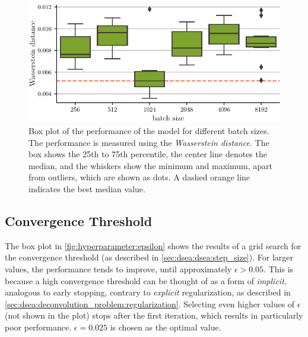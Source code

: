 \begin{figure}
  \centering
  \includegraphics[scale=1]{content/plots/hyperparam/batch_size_vs_wd_boxplot_lessheight.pdf}
  \caption{Box plot of the performance of the model for different batch sizes.
    The performance is measured using the \emph{Wasserstein distance}.
    The box shows the 25th to 75th percentile,
    the center line denotes the median,
    and the whiskers show the minimum and maximum,
      apart from outliers,
        which are shown as dots.
    A dashed orange line indicates the best median value.
  }
  \label{fig:hyperparameter:batch_size}
\end{figure}


\subsection{Convergence Threshold}
The box plot in \autoref{fig:hyperparameter:epsilon} shows the results of a grid search for the convergence threshold
  (as described in \autoref{sec:dsea:dsea:step_size}).
%
For larger values,
  the performance tends to improve,
  until approximately $\epsilon > \num{0.05}$.
This is because a high convergence threshold can be thought of as
  a form of \emph{implicit}, %
    analogous to early stopping,
  contrary to \emph{explicit} regularization,
    as described in \autoref{sec:dsea:deconvolution_problem:regularization}.
Selecting even higher values of $\epsilon$
  (not shown in the plot)
stops \dsea{} after the first iteration,
  which results in particularly poor performance.
$\epsilon = \num{0.025}$ is chosen as the optimal value.


